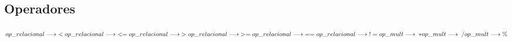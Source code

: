 \subsection{Operadores}

\begin{math}
    op\_relacional \longrightarrow \; < \\
    op\_relacional \longrightarrow \; <= \\
    op\_relacional \longrightarrow \; > \\
    op\_relacional \longrightarrow \; >= \\
    op\_relacional \longrightarrow \; == \\
    op\_relacional \longrightarrow \; != \\
    op\_mult \longrightarrow \; * \\
    op\_mult \longrightarrow \; / \\
    op\_mult \longrightarrow \%
\end{math}